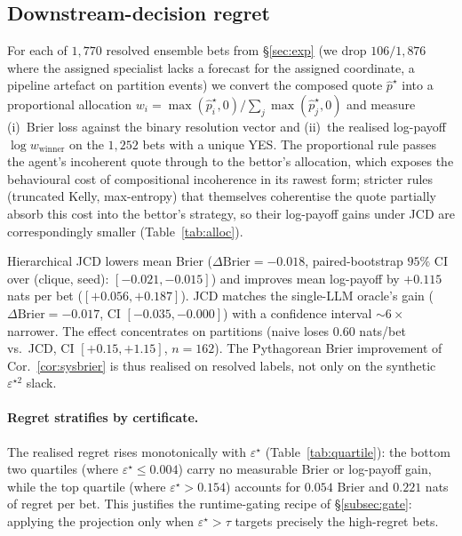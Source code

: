 \documentclass{article}
\theoremstyle{plain}
\theoremstyle{definition}
\theoremstyle{remark}
\newcommand{\eps}{\varepsilon}
\begin{document}
\begin{table}[h]
\centering
\resizebox{\linewidth}{!}{}
\caption{\textbf{Frontier vs.\ mid-tier panel} ($n\!=\!268$
partition bets each for $\eps^\star$ and $\Delta\mathrm{Brier}$;
$n\!=\!162$ unique-YES subset for $\Delta\log p$). $95\%$
paired-bootstrap CIs over (clique, seed) pairs; the mid-tier
numbers are the partition-only projection of
\S\ref{subsec:compres_results} and \S\ref{subsec:regret}.}
\label{tab:frontier}
\end{table}

\subsection{Downstream-decision regret}
\label{subsec:regret}

For each of $1{,}770$ resolved ensemble bets from \S\ref{sec:exp}
(we drop $106/1{,}876$ where the assigned specialist lacks a
forecast for the assigned coordinate, a pipeline artefact on
partition events) we convert the composed quote $\hat p^\star$ into
a proportional allocation
$w_i = \max(\hat p^\star_i,0)/\sum_j\max(\hat p^\star_j,0)$ and
measure (i)~Brier loss against the binary resolution vector and
(ii)~the realised log-payoff $\log w_{\text{winner}}$ on the
$1{,}252$ bets with a unique YES. The proportional rule passes
the agent's incoherent quote through to the bettor's allocation,
which exposes the behavioural cost of compositional incoherence
in its rawest form; stricter rules (truncated Kelly, max-entropy)
that themselves coherentise the quote partially absorb this cost
into the bettor's strategy, so their log-payoff gains under
JCD are correspondingly smaller (Table~\ref{tab:alloc}).

Hierarchical JCD lowers mean Brier ($\Delta\mathrm{Brier}=-0.018$,
paired-bootstrap $95\%$ CI over (clique, seed): $[-0.021,-0.015]$)
and improves mean log-payoff by $+0.115$ nats per bet
($[+0.056,+0.187]$). JCD matches the single-LLM oracle's gain
($\Delta\mathrm{Brier}= -0.017$, CI $[-0.035,-0.000]$) with a
confidence interval $\sim\!6\times$ narrower. The effect
concentrates on partitions (naive loses $0.60$ nats/bet vs.\ JCD,
CI $[+0.15, +1.15]$, $n{=}162$). The Pythagorean Brier improvement
of Cor.~\ref{cor:sysbrier} is thus realised on resolved labels,
not only on the synthetic $\eps^{\star 2}$ slack.

\paragraph{Regret stratifies by certificate.}
The realised regret rises monotonically with $\eps^\star$
(Table~\ref{tab:quartile}): the bottom two quartiles (where
$\eps^\star\!\le\!0.004$) carry no measurable Brier or log-payoff
gain, while the top quartile (where $\eps^\star\!>\!0.154$)
accounts for $0.054$ Brier and $0.221$ nats of regret per bet.
This justifies the runtime-gating recipe of
\S\ref{subsec:gate}: applying the projection only when
$\eps^\star\!>\!\tau$ targets precisely the high-regret bets.
\end{document}
